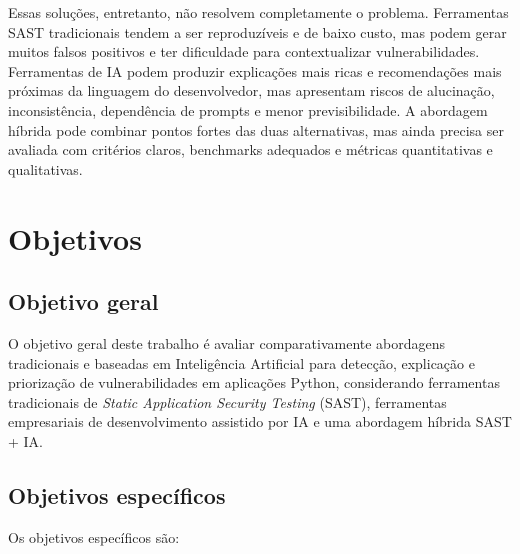 Essas soluções, entretanto, não resolvem completamente o problema. Ferramentas SAST tradicionais tendem a ser reproduzíveis e de baixo custo, mas podem gerar muitos falsos positivos e ter dificuldade para contextualizar vulnerabilidades. Ferramentas de IA podem produzir explicações mais ricas e recomendações mais próximas da linguagem do desenvolvedor, mas apresentam riscos de alucinação, inconsistência, dependência de prompts e menor previsibilidade. A abordagem híbrida pode combinar pontos fortes das duas alternativas, mas ainda precisa ser avaliada com critérios claros, benchmarks adequados e métricas quantitativas e qualitativas.
\section{Objetivos}\label{sec:objetivos}


\subsection{Objetivo geral} \label{subsec:objetivo-geral}

O objetivo geral deste trabalho é avaliar comparativamente abordagens tradicionais e baseadas em Inteligência Artificial para detecção, explicação e priorização de vulnerabilidades em aplicações Python, considerando ferramentas tradicionais de \textit{Static Application Security Testing} (SAST), ferramentas empresariais de desenvolvimento assistido por IA e uma abordagem híbrida SAST + IA.

\subsection{Objetivos específicos} \label{subsec:objetivos-especificos}

Os objetivos específicos são:

